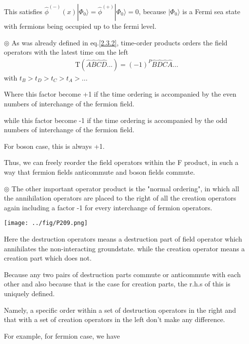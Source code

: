 This satisfies $\hat \phi^{(-)}(x)|\Phi_0\rangle=\hat \phi ^{(+)}|\Phi_0\rangle=0$, because $|\Phi_0\rangle$ is a Fermi sea state with fermions being occupied up to the fermi level.

$\circledcirc$ As was already defined in eq.\eqref{2.3.2}, time-order products orders the field operators with the latest time om the left
\begin{align}
\mathrm{T}(\hat{A}\hat{B}\hat{C}\hat{D}...)=(-1)^P\hat{B}\hat{D}\hat{C}\hat{A}... \nonumber
\end{align}
with $t_B>t_D>t_C>t_A>...$

Where this factor become +1 if the time ordering is accompanied by the even numbers of interchange of the fermion field.

while this factor become -1 if the time ordering is accompanied by the odd numbers of interchange of the fermion field.

For boson case, this is always +1.

Thus, we can freely reorder the field operators within the F product, in such a way that fermion fields anticommute and boson fields commute.

$\circledcirc$ The other important operator product is the "normal ordering", in which all the annihilation operators are placed to the right of all the creation operators again including a factor -1 for every interchange of fermion operators.
 \begin{center}
\texttt{[image: ../fig/P209.png]}
\end{center}
Here the destruction operators means a destruction part of field operator which annihilates the non-interacting groundstate. while the creation operator means a creation part which does not.

Because any two pairs of destruction parts commute or anticommute with each other and also because that is the case for creation parts, the r.h.s of this is uniquely defined.

Namely, a specific order within a set of destruction operators in the right and that with a set of creation operators in the left don't make any difference.

For example, for fermion case, we have 


